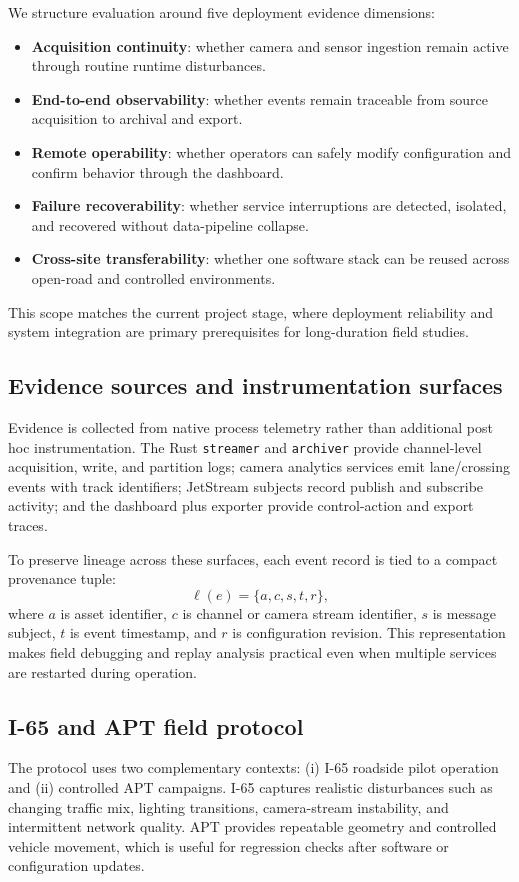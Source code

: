\documentclass[conference]{IEEEtran}
\begin{document}
We structure evaluation around five deployment evidence dimensions:
\begin{itemize}
\item \textbf{Acquisition continuity}: whether camera and sensor ingestion remain active through routine runtime disturbances.
\item \textbf{End-to-end observability}: whether events remain traceable from source acquisition to archival and export.
\item \textbf{Remote operability}: whether operators can safely modify configuration and confirm behavior through the dashboard.
\item \textbf{Failure recoverability}: whether service interruptions are detected, isolated, and recovered without data-pipeline collapse.
\item \textbf{Cross-site transferability}: whether one software stack can be reused across open-road and controlled environments.
\end{itemize}

This scope matches the current project stage, where deployment reliability and system integration are primary prerequisites for long-duration field studies.

\subsection{Evidence sources and instrumentation surfaces}
Evidence is collected from native process telemetry rather than additional post hoc instrumentation. The Rust \texttt{streamer} and \texttt{archiver} provide channel-level acquisition, write, and partition logs; camera analytics services emit lane/crossing events with track identifiers; JetStream subjects record publish and subscribe activity; and the dashboard plus exporter provide control-action and export traces.

To preserve lineage across these surfaces, each event record is tied to a compact provenance tuple:
\begin{equation}
\ell(e)=\{a,c,s,t,r\},
\end{equation}
where $a$ is asset identifier, $c$ is channel or camera stream identifier, $s$ is message subject, $t$ is event timestamp, and $r$ is configuration revision. This representation makes field debugging and replay analysis practical even when multiple services are restarted during operation.

\subsection{I-65 and APT field protocol}
The protocol uses two complementary contexts: (i) I-65 roadside pilot operation and (ii) controlled APT campaigns. I-65 captures realistic disturbances such as changing traffic mix, lighting transitions, camera-stream instability, and intermittent network quality. APT provides repeatable geometry and controlled vehicle movement, which is useful for regression checks after software or configuration updates.
\end{document}
